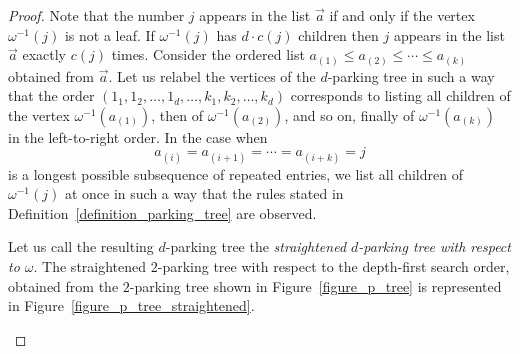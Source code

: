 \documentclass[11pt]{amsart}
\numberwithin{equation}{section}
\begin{document}
\begin{proof}
Note that the number $j$ appears in the list $\vec{a}$ if and only if
the vertex $\omega^{-1}(j)$ is not a leaf. If $\omega^{-1}(j)$ has
$d \cdot c(j)$ children then $j$ appears in the list $\vec{a}$
exactly $c(j)$ times. Consider the ordered list
$a_{(1)} \leq a_{(2)} \leq \cdots \leq a_{(k)}$ obtained from $\vec{a}$. 
Let us relabel the vertices of the $d$-parking tree in such a way that
the order $(1_{1},1_{2},\ldots, 1_{d}, \ldots, k_{1}, k_{2},\ldots, k_{d})$
corresponds to listing all children of the vertex
$\omega^{-1}(a_{(1)})$, then of $\omega^{-1}(a_{(2)})$, and so on,
finally of $\omega^{-1}(a_{(k)})$  
in the left-to-right order. In the case when
$$a_{(i)}=a_{(i+1)}=\cdots =a_{(i+k)}=j$$
is a longest possible subsequence of repeated entries, we list
all children of $\omega^{-1}(j)$ at once in such a way that the
rules stated in Definition~\ref{definition_parking_tree} are observed.  

Let us call the resulting $d$-parking tree
the {\em straightened $d$-parking tree with respect to $\omega$}. The
straightened $2$-parking tree with respect to the depth-first search
order, obtained from the $2$-parking tree shown in
Figure~\ref{figure_p_tree} is represented in
Figure~\ref{figure_p_tree_straightened}. 
\begin{figure}[ht]
\newcommand{\shift}{5.5}
\begin{center}
\hspace*{15mm}
\end{center}
\end{figure}
\end{proof}
\end{document}
